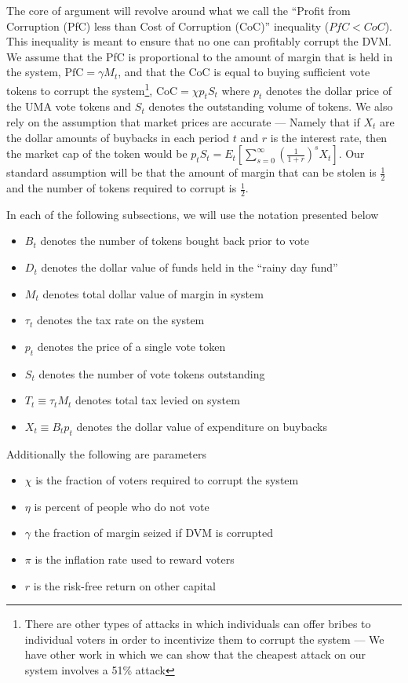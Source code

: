 \documentclass[12pt]{article}
\begin{document}
  The core of argument will revolve around what we call the ``Profit from Corruption (PfC) less than
  Cost of Corruption (CoC)'' inequality ($PfC < CoC$). This inequality is meant to ensure that no
  one can profitably corrupt the DVM. We assume that the PfC is proportional to the amount of margin
  that is held in the system, $\text{PfC} = \gamma M_t$, and that the CoC is equal to buying
  sufficient vote tokens to corrupt the system\footnote{There are other types of attacks in which
  individuals can offer bribes to individual voters in order to incentivize them to corrupt the
  system --- We have other work in which we can show that the cheapest attack on our system involves
  a 51\% attack}, $\text{CoC} = \chi p_t S_t$ where $p_t$ denotes the dollar price of the UMA vote
  tokens and $S_t$ denotes the outstanding volume of tokens. We also rely on the assumption that
  market prices are accurate --- Namely that if $X_t$ are the dollar amounts of buybacks in each
  period $t$ and $r$ is the interest rate, then the market cap of the token would be
  $p_t S_t = E_t \left[ \sum_{s=0}^{\infty} \left(\frac{1}{1 + r}\right)^s X_t \right]$. Our
  standard assumption will be that the amount of margin that can be stolen is $\frac{1}{2}$ and the
  number of tokens required to corrupt is $\frac{1}{2}$.

  In each of the following subsections, we will use the notation presented below

  \begin{itemize}
    \item $B_t$ denotes the number of tokens bought back prior to vote
    \item $D_t$ denotes the dollar value of funds held in the ``rainy day fund''
    \item $M_t$ denotes total dollar value of margin in system
    \item $\tau_t$ denotes the tax rate on the system
    \item $p_t$ denotes the price of a single vote token
    \item $S_t$ denotes the number of vote tokens outstanding
    \item $T_t \equiv \tau_t M_t$ denotes total tax levied on system
    \item $X_t \equiv B_t p_t$ denotes the dollar value of expenditure on buybacks
  \end{itemize}

  Additionally the following are parameters

  \begin{itemize}
    \item $\chi$ is the fraction of voters required to corrupt the system
    \item $\eta$ is percent of people who do not vote
    \item $\gamma$ the fraction of margin seized if DVM is corrupted
    \item $\pi$ is the inflation rate used to reward voters
    \item $r$ is the risk-free return on other capital
  \end{itemize}
\end{document}
